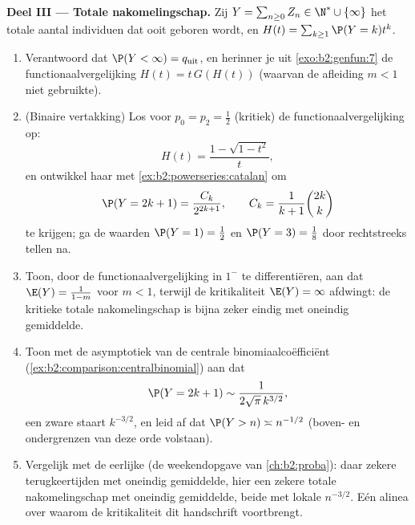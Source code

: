 \begin{problem}
\medskip
\noindent\textbf{Deel III --- Totale nakomelingschap.} Zij $Y =
\sum_{n\geq0}Z_n \in \N^* \cup \{\infty\}$ het totale aantal
individuen dat ooit geboren wordt, en $H(t) = \sum_{k\geq1}\P(Y =
k)t^k$.
\begin{enumerate}[resume]
  \item Verantwoord dat $\P(Y < \infty) = q_{\mathrm{uit}}$, en
        herinner je uit \cref{exo:b2:genfun:7} de
        functionaalvergelijking $H(t) = t\,G(H(t))$ (waarvan de
        afleiding $m < 1$ niet gebruikte).
  \item (Binaire vertakking) Los voor $p_0 = p_2 = \frac12$
        (kritiek) de functionaalvergelijking op:
        \[
        H(t) = \frac{1 - \sqrt{1 - t^2}}{t},
        \]
        en ontwikkel haar met \cref{ex:b2:powerseries:catalan} om
        \[
        \P(Y = 2k + 1) = \frac{C_k}{2^{2k+1}},
        \qquad C_k = \frac1{k+1}\binom{2k}k
        \]
        te krijgen; ga de waarden $\P(Y = 1) = \frac12$ en $\P(Y =
        3) = \frac18$ door rechtstreeks tellen na.
  \item Toon, door de functionaalvergelijking in $1^-$ te
        differentiëren, aan dat $\E(Y) = \frac{1}{1-m}$ voor $m <
        1$, terwijl de kritikaliteit $\E(Y) = \infty$ afdwingt: de
        kritieke totale nakomelingschap is bijna zeker eindig met
        oneindig gemiddelde.
  \item Toon met de asymptotiek van de centrale
        binomiaalcoëfficiënt
        (\cref{ex:b2:comparison:centralbinomial}) aan dat
        \[
        \P(Y = 2k+1) \sim \frac{1}{2\sqrt\pi\,k^{3/2}},
        \]
        een zware staart $k^{-3/2}$, en leid af dat $\P(Y > n)
        \asymp n^{-1/2}$ (boven- en ondergrenzen van deze orde
        volstaan).
  \item Vergelijk met de eerlijke  (de
        weekendopgave van \cref{ch:b2:proba}): daar zekere
        terugkeertijden met oneindig gemiddelde, hier een zekere
        totale nakomelingschap met oneindig gemiddelde, beide met
        lokale  $n^{-3/2}$. Eén alinea over waarom de
        kritikaliteit dit handschrift voortbrengt.
\end{enumerate}


\end{problem}
